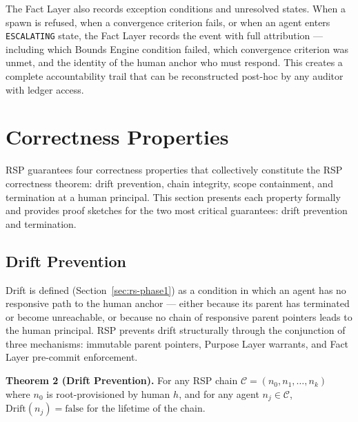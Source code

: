 The Fact Layer also records exception conditions and unresolved states. When a spawn is refused, when a convergence criterion fails, or when an agent enters \texttt{ESCALATING} state, the Fact Layer records the event with full attribution — including which Bounds Engine condition failed, which convergence criterion was unmet, and the identity of the human anchor who must respond. This creates a complete accountability trail that can be reconstructed post-hoc by any auditor with ledger access.

\section{Correctness Properties}
\label{sec:rs-correctness}

RSP guarantees four correctness properties that collectively constitute the RSP correctness theorem: drift prevention, chain integrity, scope containment, and termination at a human principal. This section presents each property formally and provides proof sketches for the two most critical guarantees: drift prevention and termination.

\subsection{Drift Prevention}
\label{sec:rs-drift-prevention}

Drift is defined (Section~\ref{sec:rs-phase1}) as a condition in which an agent has no responsive path to the human anchor — either because its parent has terminated or become unreachable, or because no chain of responsive parent pointers leads to the human principal. RSP prevents drift structurally through the conjunction of three mechanisms: immutable parent pointers, Purpose Layer warrants, and Fact Layer pre-commit enforcement.

\begin{mdframed}[style=theorem]
\textbf{Theorem 2 (Drift Prevention).}
For any RSP chain $\mathcal{C} = (n_0, n_1, \ldots, n_k)$ where $n_0$ is root-provisioned by human $h$, and for any agent $n_j \in \mathcal{C}$, $\text{Drift}(n_j) = \text{false}$ for the lifetime of the chain.
\end{mdframed}

